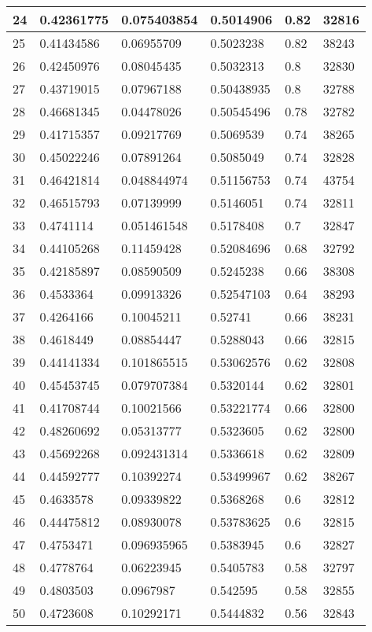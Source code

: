 \begin{longtable}{|l|l|l|l|l|l|}
24 & 0.42361775 & 0.075403854 & 0.5014906 & 0.82 & 32816 \\ \hline 
25 & 0.41434586 & 0.06955709 & 0.5023238 & 0.82 & 38243 \\ \hline 
26 & 0.42450976 & 0.08045435 & 0.5032313 & 0.8 & 32830 \\ \hline 
27 & 0.43719015 & 0.07967188 & 0.50438935 & 0.8 & 32788 \\ \hline 
28 & 0.46681345 & 0.04478026 & 0.50545496 & 0.78 & 32782 \\ \hline 
29 & 0.41715357 & 0.09217769 & 0.5069539 & 0.74 & 38265 \\ \hline 
30 & 0.45022246 & 0.07891264 & 0.5085049 & 0.74 & 32828 \\ \hline 
31 & 0.46421814 & 0.048844974 & 0.51156753 & 0.74 & 43754 \\ \hline 
32 & 0.46515793 & 0.07139999 & 0.5146051 & 0.74 & 32811 \\ \hline 
33 & 0.4741114 & 0.051461548 & 0.5178408 & 0.7 & 32847 \\ \hline 
34 & 0.44105268 & 0.11459428 & 0.52084696 & 0.68 & 32792 \\ \hline 
35 & 0.42185897 & 0.08590509 & 0.5245238 & 0.66 & 38308 \\ \hline 
36 & 0.4533364 & 0.09913326 & 0.52547103 & 0.64 & 38293 \\ \hline 
37 & 0.4264166 & 0.10045211 & 0.52741 & 0.66 & 38231 \\ \hline 
38 & 0.4618449 & 0.08854447 & 0.5288043 & 0.66 & 32815 \\ \hline 
39 & 0.44141334 & 0.101865515 & 0.53062576 & 0.62 & 32808 \\ \hline 
40 & 0.45453745 & 0.079707384 & 0.5320144 & 0.62 & 32801 \\ \hline 
41 & 0.41708744 & 0.10021566 & 0.53221774 & 0.66 & 32800 \\ \hline 
42 & 0.48260692 & 0.05313777 & 0.5323605 & 0.62 & 32800 \\ \hline 
43 & 0.45692268 & 0.092431314 & 0.5336618 & 0.62 & 32809 \\ \hline 
44 & 0.44592777 & 0.10392274 & 0.53499967 & 0.62 & 38267 \\ \hline 
45 & 0.4633578 & 0.09339822 & 0.5368268 & 0.6 & 32812 \\ \hline 
46 & 0.44475812 & 0.08930078 & 0.53783625 & 0.6 & 32815 \\ \hline 
47 & 0.4753471 & 0.096935965 & 0.5383945 & 0.6 & 32827 \\ \hline 
48 & 0.4778764 & 0.06223945 & 0.5405783 & 0.58 & 32797 \\ \hline 
49 & 0.4803503 & 0.0967987 & 0.542595 & 0.58 & 32855 \\ \hline 
50 & 0.4723608 & 0.10292171 & 0.5444832 & 0.56 & 32843 \\ \hline 
\end{longtable}